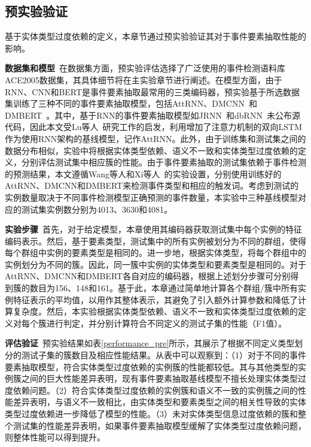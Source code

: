 \subsection{预实验验证}
\label{pre_experiment}
基于实体类型过度依赖的定义，本章节通过预实验验证其对于事件要素抽取性能的影响。

\textbf{数据集和模型}~在数据集方面，预实验评估选择了广泛使用的事件检测语料库ACE2005数据集，其具体细节将在主实验章节进行阐述。在模型方面，由于RNN、CNN和BERT是事件要素抽取最常用的三类编码器，预实验基于所选数据集训练了三种不同的事件要素抽取模型，包括AttRNN、DMCNN~\cite{chen2015event}和DMBERT~\cite{wang2019adversarial}。其中，基于RNN的事件要素抽取模型如JRNN~\cite{nguyen2016joint}和dbRNN~\cite{sha2018jointly}未公布源代码，因此本文受Lu等人~\cite{lu2019distilling}研究工作的启发，利用增加了注意力机制的双向LSTM作为使用RNN架构的基线模型，记作AttRNN。此外，由于训练集和测试集之间的数据分布相似，实验中将根据实体类型依赖、语义不一致和实体类型过度依赖的定义，分别评估测试集中相应簇的性能。由于事件要素抽取的测试集依赖于事件检测的预测结果，本文遵循Wang等人和Xi等人~\cite{wang2019hmeae,xiangyu2021capturing}的实验设置，分别使用训练好的AttRNN、DMCNN和DMBERT来检测事件类型和相应的触发词。考虑到测试的实例数量取决于不同事件检测模型正确预测的事件数量，本实验中三种基线模型对应的测试集实例数分别为4013、3630和4081。

\textbf{实验步骤}~首先，对于给定模型，本章使用其编码器获取测试集中每个实例的特征编码表示。然后，基于要素类型，测试集中的所有实例被划分为不同的群组，使得每个群组中实例的要素类型是相同的。进一步地，根据实体类型，将每个群组中的实例划分为不同的簇。因此，同一簇中实例的实体类型和要素类型是相同的。对于AttRNN、DMCNN和DMBERT各自对应的编码器，根据上述划分步骤可分别得到簇的数目为156、148和161。基于此，本章通过简单地计算各个群组/簇中所有实例特征表示的平均值，以用作其整体表示，其避免了引入额外计算参数和降低了计算复杂度。然后，本实验根据实体类型依赖、语义不一致和实体类型过度依赖的定义对每个簇进行判定，并分别计算符合不同定义的测试子集的性能（F1值）。

\textbf{评估验证}~预实验结果如表\ref{performance_pre}所示，其展示了根据不同定义类型划分的测试子集的簇数目及相应性能结果。从表中可以观察到：（1）对于不同的事件要素抽取模型，符合实体类型过度依赖的实例簇的性能都较低。其与其他类型的实例簇之间的巨大性能差异表明，现有事件要素抽取基线模型不擅长处理实体类型过度依赖问题。（2）符合实体类型过度依赖的实例簇和语义不一致的实例簇之间的性能差异表明，与语义不一致相比，由实体类型和要素类型之间的相关性导致的实体类型过度依赖进一步降低了模型的性能。（3）未对实体类型信息过度依赖的簇和整个测试集的性能差异表明，如果事件要素抽取模型缓解了实体类型过度依赖问题，则整体性能可以得到提升。

